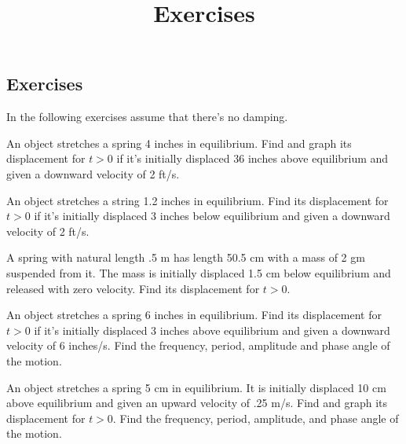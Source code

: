\documentclass{ximera}
\title{Exercises} \license{CC BY-NC-SA 4.0}
\begin{document}
\begin{abstract}
\end{abstract}
\maketitle

\begin{onlineOnly}
\section*{Exercises}
\end{onlineOnly}

In the following exercises assume that there's no damping.

\begin{problem}\label{exer:6.1.1}
An object stretches a spring 4 inches in equilibrium.
Find and graph its displacement for $t>0$ if it's initially displaced
36 inches above equilibrium and given a downward velocity of 2 ft/s.
\end{problem}

\begin{problem}\label{exer:6.1.2}
An object  stretches a string 1.2 inches in equilibrium.
Find its displacement for $t>0$ if it's initially displaced 3 inches
below equilibrium and given a downward velocity of 2 ft/s.
\end{problem}

\begin{problem}\label{exer:6.1.3}
A spring with natural length .5 m has length 50.5 cm with a mass of 2
gm suspended from it. The mass is initially displaced 1.5 cm below
equilibrium and released with zero velocity. Find its displacement for
$t>0$.
\end{problem}

\begin{problem}\label{exer:6.1.4}
An object stretches a spring 6 inches in equilibrium. Find its
displacement for $t>0$ if it's initially displaced 3 inches above
equilibrium and given a downward velocity of 6 inches/s. Find the
frequency, period, amplitude and phase angle of the motion.
\end{problem}

\begin{problem}\label{exer:6.1.5}
An object stretches a spring 5 cm in equilibrium. It is initially
displaced 10 cm above equilibrium and given an upward velocity of .25
m/s. Find and graph its displacement for $t>0$. Find the frequency,
period, amplitude, and phase angle of the motion.
\end{problem}
\end{document}
